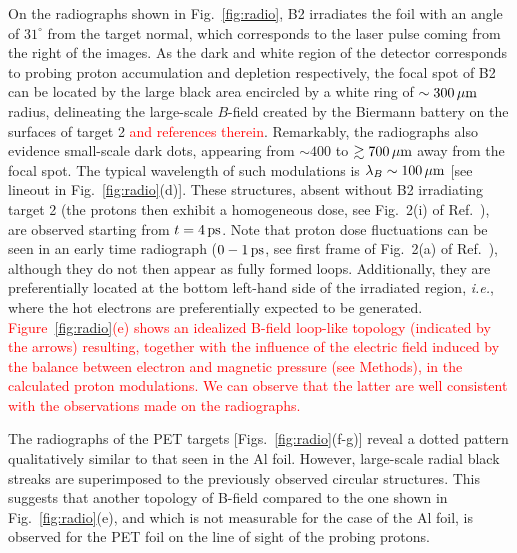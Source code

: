 \documentclass[aps,twocolumn,showpacs,superscriptaddress]{revtex4}
\begin{document}
On the radiographs shown in Fig.~\ref{fig:radio}, B2 irradiates the foil with an angle of $31^\circ$ from the target normal, which corresponds to the laser pulse coming from the right of the images. 
As the dark and white region of the detector corresponds to probing proton accumulation and depletion respectively, 
the focal spot of B2 can be located by the large black area encircled by a white ring of $\sim 300\,\rm \mu m$ radius, delineating the large-scale $B$-field created by the Biermann battery on the surfaces of target 2 \cite{RSI_Albertazzi_2015} \textcolor{red}{and references therein}. Remarkably, the radiographs also evidence small-scale dark dots, appearing from $\sim 400$ to $\gtrsim 700\,\rm \mu m$ away from the focal spot. The typical wavelength of such modulations is $\lambda_B \sim 100\,\rm \mu m$ [see lineout in Fig.~\ref{fig:radio}(d)].
These structures, absent without B2 irradiating target 2 (the protons then exhibit a homogeneous dose, see Fig.~2(i) of Ref.~\cite{RSI_Albertazzi_2015}), are observed starting from $t=4\,\rm ps$. Note that proton dose fluctuations can be seen in an early time radiograph ($0-1\,\rm ps$, see first frame of Fig.~2(a) of Ref.~\cite{RSI_Albertazzi_2015}), although they do not then appear as fully formed loops. Additionally, they are preferentially located at the bottom left-hand side of the irradiated region, \emph{i.e.}, where the hot electrons are preferentially expected to be generated.
\textcolor{red}{Figure~\ref{fig:radio}(e) shows an idealized B-field loop-like topology (indicated by the arrows) resulting, together with the influence of the electric field induced by the balance between electron and magnetic pressure (see Methods), in the calculated proton modulations. We can observe that the latter are well consistent with the observations made on the radiographs.}  

The radiographs of the PET targets [Figs.~\ref{fig:radio}(f-g)] reveal a dotted pattern qualitatively similar to that seen in the Al foil. However, large-scale radial black streaks are superimposed to the previously observed circular structures. This suggests that another topology of B-field compared to the one shown in Fig.~\ref{fig:radio}(e), and which is not measurable for the case of the Al foil, is observed for the PET foil on the line of sight of the probing protons. 
\end{document}
